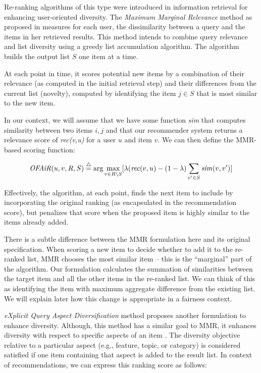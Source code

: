 Re-ranking algorithms of this type were introduced in information retrieval for enhancing user-oriented diversity. The \textit{Maximum Marginal Relevance} method as proposed in \cite{carbonell1998use} measures for each user, the dissimilarity between a query and the items in her retrieved results. This method intends to combine query relevance and list diversity using a greedy list accumulation algorithm. The algorithm builds the output list $S$ one item at a time. 

At each point in time, it scores potential new items by a combination of their relevance (as computed in the initial retrieval step) and their differences from the current list (novelty), computed by identifying the item $j \in S$ that is most similar to the new item.

In our context, we will assume that we have some function \textit{sim} that computes similarity between two items $i, j$ and that our recommender system returns a relevance score of \textit{rec(v,u)} for a user $u$ and item $v$. We can then define the MMR-based scoring function:

\begin{equation}
    \mathit{OFAiR}(u,v,R,S)\buildrel\triangle\over= \arg\max_{v \in R \setminus S} [\lambda  (\mathit{rec}(v,u) - (1 - \lambda) \sum_{v' \in S} \mathit{sim}(v,v')]
\label{eq:mmr}
\end{equation}

Effectively, the algorithm, at each point, finds the next item to include by incorporating the original ranking (as encapsulated in the recommendation score), but penalizes that score when the proposed item is highly similar to the items already added.

There is a subtle difference between the MMR formulation here and its original specification. When scoring a new item to decide whether to add it to the re-ranked list, MMR chooses the most similar item -- this is the ``marginal'' part of the algorithm. Our formulation calculates the summation of similarities between the target item and all the other items in the re-ranked list. We can think of this as identifying the item with maximum aggregate difference from the existing list. We will explain later how this change is appropriate in a fairness context.

\textit{eXplicit Query Aspect Diversification} method proposes another formulation to enhance diversity. Although, this method has a similar goal to MMR, it enhances diversity with respect to specific aspects of an item \cite{santos2015search}. The diversity objective relative to a particular aspect (e.g., feature, topic, or category) is considered satisfied if one item containing that aspect is added to the result list. In context of recommendations, we can express this ranking score as follows:

